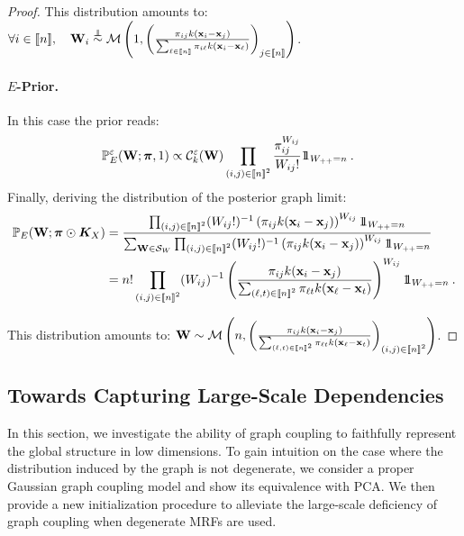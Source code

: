\begin{proof}
This distribution amounts to: $\forall i \in \integ{n}, \quad \W_{i} \stackrel{\perp\!\!\!\!\perp}{\sim} \mathcal{M}\left(1, \left(\frac{\pi_{ij} k(\mathbf{x}_i - \mathbf{x}_j)}{\sum_{\ell \in \integ{n}} \pi_{i\ell} k(\mathbf{x}_i - \mathbf{x}_{\ell})}\right)_{j \in \integ{n}}\right)$.

\paragraph{$E$-Prior.}
In this case the prior reads:
\begin{align*}
    \mathbb{P}_{E}^{\varepsilon}({\mathbf{W}}; \bm{\pi}, 1) &\propto \mathcal{C}_{k}^{\varepsilon}({\mathbf{W}}) \prod_{(i,j) \in {[\![n]\!]}^2} \frac{\pi_{ij}^{W_{ij}}}{W_{ij}!} 1\!\!1_{W_{++} = n} \:.
\end{align*}
Finally, deriving the distribution of the posterior graph limit:
\begin{align*}
    \mathbb{P}_{E}(\W ;\bm{\pi} \odot \bm{K}_{X}) &= \frac{\prod_{(i,j) \in \integ{n}^2}  (W_{ij}!)^{-1}\left(\pi_{ij} k(\mathbf{x}_i - \mathbf{x}_j)\right)^{W_{ij}} \ind_{W_{++} = n}}{\sum_{\W \in \mathcal{S}_{W}} \prod_{(i,j) \in \integ{n}^2} (W_{ij}!)^{-1} \left(\pi_{ij} k(\mathbf{x}_i - \mathbf{x}_j)\right)^{W_{ij}} \ind_{W_{++} = n}} \\
    &= n! \prod_{(i,j) \in \integ{n}^2} (W_{ij})^{-1} \left(\frac{\pi_{ij} k(\mathbf{x}_i - \mathbf{x}_j)}{\sum_{(\ell,t) \in \integ{n}^2} \pi_{\ell t} k(\mathbf{x}_{\ell} - \mathbf{x}_t)}\right)^{W_{ij}} \ind_{W_{++} = n} \:.
\end{align*}

This distribution amounts to: $\mathbf{W} \sim \mathcal{M}\left(n, \left(\frac{\pi_{ij} k(\mathbf{x}_i - \mathbf{x}_j)}{\sum_{(\ell,t) \in {[\![n]\!]}^2} \pi_{\ell t} k(\mathbf{x}_{\ell} - \mathbf{x}_t)}\right)_{(i,j) \in {[\![n]\!]}^2}\right)$.
\end{proof}


\subsection{Towards Capturing Large-Scale Dependencies}\label{sec:towards_large_scale}

In this section, we investigate the ability of graph coupling to faithfully represent the global structure in low dimensions. To gain intuition on the case where the distribution induced by the graph is not degenerate, we consider a proper Gaussian graph coupling model and show its equivalence with PCA. We then provide a new initialization procedure to alleviate the large-scale deficiency of graph coupling when degenerate MRFs are used.

